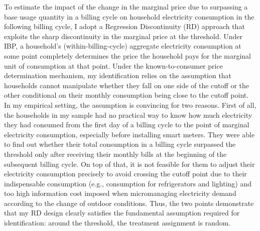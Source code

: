 To estimate the impact of the change in the marginal price due to surpassing a base usage quantity in a billing cycle on household electricity consumption in the following billing cycle, I adopt a Regression Discontinuity (RD) approach that exploits the sharp discontinuity in the marginal price at the threshold. Under IBP, a household's (within-billing-cycle) aggregate electricity consumption at some point completely determines the price the household pays for the marginal unit of consumption at that point. Under the known-to-consumer price determination mechanism, my identification relies on the assumption that households cannot manipulate whether they fall on one side of the cutoff or the other conditional on their monthly consumption being close to the cutoff point. In my empirical setting, the assumption is convincing for two reasons. First of all, the households in my sample had no practical way to know how much electricity they had consumed from the first day of a billing cycle to the point of marginal electricity consumption, especially before installing smart meters. They were able to find out whether their total consumption in a billing cycle surpassed the threshold only after receiving their monthly bills at the beginning of the subsequent billing cycle. On top of that, it is not feasible for them to adjust their electricity consumption precisely to avoid crossing the cutoff point due to their indispensable consumption (e.g., consumption for refrigerators and lighting) and too high information cost imposed when micromanaging electricity demand according to the change of outdoor conditions. Thus, the two points demonstrate that my RD design clearly satisfies the fundamental assumption required for identification: around the threshold, the treatment assignment is random.

